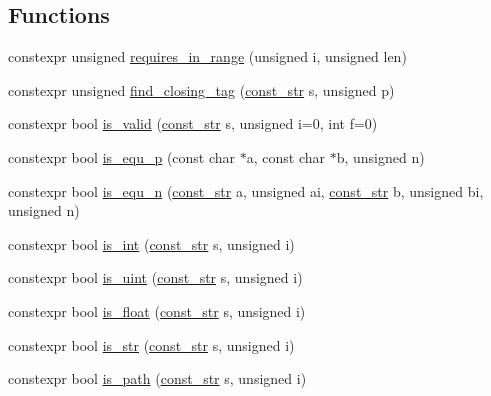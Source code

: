 \subsection*{Functions}
\begin{DoxyCompactItemize}
\item 
constexpr unsigned \hyperlink{namespacecrow_1_1black__magic_a1c2aff5573639d46df93ffada058c686}{requires\-\_\-in\-\_\-range} (unsigned i, unsigned len)
\item 
constexpr unsigned \hyperlink{namespacecrow_1_1black__magic_a21fead60e1668e81ef9dbdbd1a158694}{find\-\_\-closing\-\_\-tag} (\hyperlink{classcrow_1_1black__magic_1_1const__str}{const\-\_\-str} s, unsigned p)
\item 
constexpr bool \hyperlink{namespacecrow_1_1black__magic_afc88027e704873c372fb51b5e56370da}{is\-\_\-valid} (\hyperlink{classcrow_1_1black__magic_1_1const__str}{const\-\_\-str} s, unsigned i=0, int f=0)
\item 
constexpr bool \hyperlink{namespacecrow_1_1black__magic_ad1873e3cf98eb8ed4f495272f86197cf}{is\-\_\-equ\-\_\-p} (const char $\ast$a, const char $\ast$b, unsigned n)
\item 
constexpr bool \hyperlink{namespacecrow_1_1black__magic_a38e0df4f002e2743c45ad435a4c9cf51}{is\-\_\-equ\-\_\-n} (\hyperlink{classcrow_1_1black__magic_1_1const__str}{const\-\_\-str} a, unsigned ai, \hyperlink{classcrow_1_1black__magic_1_1const__str}{const\-\_\-str} b, unsigned bi, unsigned n)
\item 
constexpr bool \hyperlink{namespacecrow_1_1black__magic_a35c7106101b8789c8b4d28e45a43fac5}{is\-\_\-int} (\hyperlink{classcrow_1_1black__magic_1_1const__str}{const\-\_\-str} s, unsigned i)
\item 
constexpr bool \hyperlink{namespacecrow_1_1black__magic_a2d8e83151f7d6b3389fea3d6dc394115}{is\-\_\-uint} (\hyperlink{classcrow_1_1black__magic_1_1const__str}{const\-\_\-str} s, unsigned i)
\item 
constexpr bool \hyperlink{namespacecrow_1_1black__magic_a57bad212b24512e47aa460cfef75c1a4}{is\-\_\-float} (\hyperlink{classcrow_1_1black__magic_1_1const__str}{const\-\_\-str} s, unsigned i)
\item 
constexpr bool \hyperlink{namespacecrow_1_1black__magic_a2eb0eb4514228192b878653bb56b7d44}{is\-\_\-str} (\hyperlink{classcrow_1_1black__magic_1_1const__str}{const\-\_\-str} s, unsigned i)
\item 
constexpr bool \hyperlink{namespacecrow_1_1black__magic_af0899340936b274931de7ac21fb4ed9f}{is\-\_\-path} (\hyperlink{classcrow_1_1black__magic_1_1const__str}{const\-\_\-str} s, unsigned i)

\end{DoxyCompactItemize}
